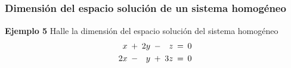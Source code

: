 
\subsection{}

\begin{frame}\frametitle{Dimensión del espacio solución de un sistema homogéneo}



\begin{ej}{\textbf{Ejemplo 5}} \justifying
	Halle la dimensión del espacio solución del sistema homogéneo
	\[	
	\begin{array}{r@{\hspace{0.8\tabcolsep}}c@{\hspace{0.8\tabcolsep}}r@{\hspace{0.8\tabcolsep}}c@{\hspace{0.8\tabcolsep}}r@{\hspace{0.8\tabcolsep}}c@{\hspace{0.8\tabcolsep}}l@{\hspace{0.8\tabcolsep}}} 
		x & + & 2y & - & z & = & 0 \\[1mm]  
		2x & - & y & + & 3z & = & 0 
	\end{array}
	\]
\end{ej}	

\end{frame}


\subsection{}

